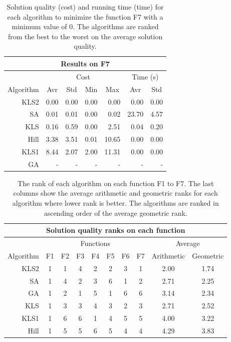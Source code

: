 \documentclass{article}
\begin{document}
\begin{table}[ht]
\centering
\begin{tabular}{r|rrrr|rr}

\hline
\multicolumn{7}{c}{{\bf Results on F7}}\\
\hline\hline
\multicolumn{1}{c}{} &
\multicolumn{4}{|c|}{Cost} &
\multicolumn{2}{c}{Time (s)}\\
\multicolumn{1}{c|}{Algorithm}
& \multicolumn{1}{c}{Avr}
& \multicolumn{1}{c}{Std}
& \multicolumn{1}{c}{Min}
& \multicolumn{1}{c}{Max}
& \multicolumn{1}{|c}{Avr}
& \multicolumn{1}{c}{Std} \\
\hline
KLS2 & 0.00 & 0.00 & 0.00 &  0.00 &  0.00 & 0.00\\
SA   & 0.01 & 0.01 & 0.00 &  0.02 & 23.70 & 4.57\\
KLS  & 0.16 & 0.59 & 0.00 &  2.51 &  0.04 & 0.20\\
Hill & 3.38 & 3.51 & 0.01 & 10.65 &  0.00 & 0.00\\
KLS1 & 8.44 & 2.07 & 2.00 & 11.31 &  0.00 & 0.00\\
GA   & -    & -    & -    & -     & -     & -   \\
\hline

\end{tabular}
\caption{Solution quality (cost) and running time (time) for each
  algorithm to minimize the function F7 with a minimum value of
  $0$. The algorithms are ranked from the best to the worst on the
  average solution quality.}
\label{tab:f7}
\end{table}

\begin{table}[ht]
\centering
\begin{tabular}{r|ccccccc|cc}

\hline
\multicolumn{10}{c}{{\bf Solution quality ranks on each function}}\\
\hline\hline
\multicolumn{1}{c}{} &
\multicolumn{7}{|c}{Functions} &
\multicolumn{2}{|c}{Average}\\
\multicolumn{1}{c|}{Algorithm} &
\multicolumn{1}{c}{F1} &
\multicolumn{1}{c}{F2} &
\multicolumn{1}{c}{F3} &
\multicolumn{1}{c}{F4} &
\multicolumn{1}{c}{F5} &
\multicolumn{1}{c}{F6} &
\multicolumn{1}{c}{F7} &
\multicolumn{1}{|c}{Arithmetic} &
\multicolumn{1}{c}{Geometric}\\
\hline
KLS2 & 1 & 1 & 4 & 2 & 2 & 3 & 1 & 2.00 & 1.74 \\
SA   & 1 & 4 & 2 & 3 & 6 & 1 & 2 & 2.71 & 2.25 \\
GA   & 1 & 2 & 1 & 5 & 1 & 6 & 6 & 3.14 & 2.34 \\
KLS  & 1 & 3 & 3 & 4 & 3 & 2 & 3 & 2.71 & 2.52 \\
KLS1 & 1 & 6 & 6 & 1 & 4 & 5 & 5 & 4.00 & 3.22 \\
Hill & 1 & 5 & 5 & 6 & 5 & 4 & 4 & 4.29 & 3.83 \\
\hline

\end{tabular}
\caption{The rank of each algorithm on each function F1 to F7. The
  last columns show the average arithmetic and geometric ranks for
  each algorithm where lower rank is better. The algorithms are ranked
  in ascending order of the average geometric rank.}
\label{tab:ranks}
\end{table}
\end{document}
